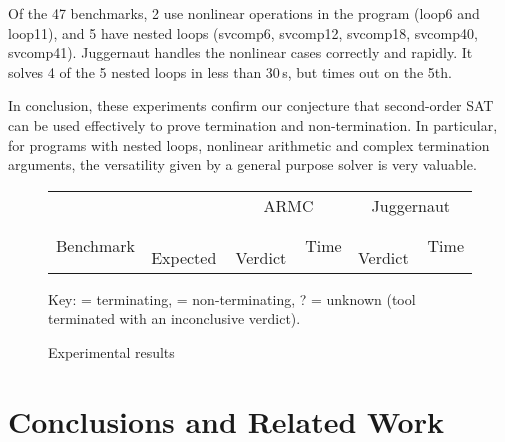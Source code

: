 \documentclass[a4paper]{llncs}
\newcommand{\xmark}{\ding{55}}
\newcommand{\tick}{\checkmark}
\begin{document}
Of the 47 benchmarks, 2 use nonlinear operations in the program (loop6 and loop11),
and 5 have nested loops (svcomp6, svcomp12, svcomp18, svcomp40, svcomp41).
{\sc Juggernaut} handles the nonlinear cases correctly and rapidly.
It solves 4 of the 5 nested loops in less than 30\,s, but times out on the 5th.


In conclusion,
these experiments confirm our conjecture that second-order SAT can be used
effectively to prove termination and non-termination.  In particular,
for programs with nested loops, nonlinear arithmetic and complex
termination arguments, the versatility given by a general purpose solver %
is very valuable.

\begin{figure}
\centering
\small
\begin{tabular}{|l|@{}c@{}||@{}c@{}|r||@{}c@{}|r|}
\hline
          &             & \multicolumn{2}{|c||}{\sc ARMC} & \multicolumn{2}{|c|}{\sc Juggernaut} \\
Benchmark & \,Expected\, & \,Verdict\, & Time & \,Verdict\, & Time \\
    \hline
    \hline

    \hline
\end{tabular}

Key: \tick = terminating, \xmark = non-terminating, ? = unknown (tool terminated with an inconclusive verdict).

\caption{Experimental results\label{fig:experiments}}
 \end{figure}

\section{Conclusions and Related Work}
\end{document}
